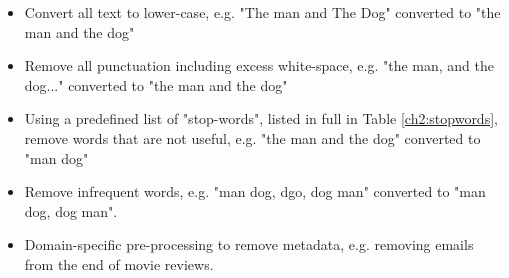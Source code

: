 \begin{itemize}
	\item  Convert all text to lower-case, e.g. "The man and The Dog" converted to "the man and the dog"
	\item  Remove all punctuation including excess white-space, e.g. "the man, and the dog..." converted to "the man and the dog"
	\item Using a predefined list of "stop-words", listed in full in Table \ref{ch2:stopwords}, remove words that are not useful, e.g. "the man and the dog" converted to "man dog"
	\item Remove infrequent words, e.g. "man dog, dgo, dog man" converted to "man dog, dog man".
	\item Domain-specific pre-processing to remove metadata, e.g. removing emails from the end of movie reviews.
\end{itemize}











